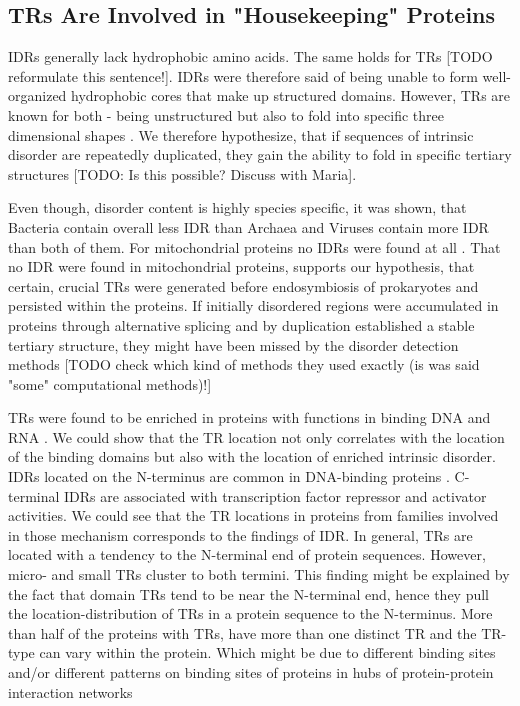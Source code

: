\documentclass[a4,center,fleqn]{NAR}
\begin{document}
\subsection{TRs Are Involved in "Housekeeping" \cite{Ferguson2005} Proteins}
IDRs generally lack hydrophobic amino acids. The same holds for TRs [TODO reformulate this sentence!]. IDRs were therefore said of being unable to form well-organized hydrophobic cores that make up structured domains. However, TRs are known for both - being unstructured but also to fold into specific three dimensional shapes \cite{Kajava2012, Paladin2016}. We therefore hypothesize, that if sequences of intrinsic disorder are repeatedly duplicated, they gain the ability to fold in specific tertiary structures [TODO: Is this possible? Discuss with Maria].

Even though, disorder content is highly species specific, it was shown, that Bacteria contain overall less IDR than Archaea and Viruses contain more IDR than both of them. For mitochondrial proteins no IDRs were found at all \cite{vanderLee2014, Pavlovic2011, Pentony2010}. 
That no IDR were found in mitochondrial proteins, supports our hypothesis, that certain, crucial TRs were generated before endosymbiosis of prokaryotes and persisted within the proteins. If initially disordered regions were accumulated in proteins through alternative splicing and by duplication established a stable tertiary structure, they might have been missed by the disorder detection methods [TODO check which kind of methods they used exactly (is was said "some" computational methods)!] 

TRs were found to be enriched in proteins with functions in binding DNA and RNA \cite{Lobley2007}. We could show that the TR location not only correlates with the location of the binding domains but also with the location of enriched intrinsic disorder. IDRs located on the N-terminus are common in DNA-binding proteins \cite{Vuzman2010}. C-terminal IDRs are associated with transcription factor repressor and activator activities. 
We could see that the TR locations in proteins from families involved in those mechanism corresponds to the findings of IDR. 
In general, TRs are located with a tendency to the N-terminal end of protein sequences. However, micro- and small TRs cluster to both termini.
This finding might be explained by the fact that domain TRs tend to be near the N-terminal end, hence they pull the location-distribution of TRs in a protein sequence to the N-terminus.
More than half of the proteins with TRs, have more than one distinct TR and the TR-type can vary within the protein. Which might be due to different binding sites and/or different patterns on binding sites of proteins in hubs of protein-protein interaction networks
\end{document}
